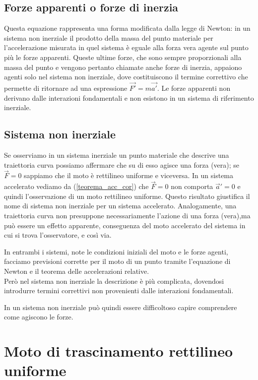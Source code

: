 \documentclass[class=book, crop=false, oneside, 12pt]{standalone}
\begin{document}
\subsection{Forze apparenti o forze di inerzia}
Questa equazione rappresenta una forma modificata dalla legge di Newton: in un sistema non inerziale il prodotto della massa del punto materiale per l'accelerazione misurata in quel sistema è eguale alla forza vera agente sul punto più le forze apparenti. 
Queste ultime forze, che sono sempre proporzionali alla massa del punto e vengono pertanto chiamate anche forze di inerzia, appaiono agenti solo nel sistema non inerziale, dove costituiscono il termine correttivo che permette di ritornare ad una espressione \(\overrightarrow{F'} = m \overrightarrow{a'}\).
Le forze apparenti non derivano dalle interazioni fondamentali e non esistono in un sistema di riferimento inerziale.

\subsection{Sistema non inerziale}

Se osserviamo in un sistema inerziale un punto materiale che descrive una traiettoria curva possiamo affermare che su di esso agisce una forza (vera); se \(\overrightarrow{F} = 0\) sappiamo che il moto è rettilineo uniforme e viceversa.\newline
In un sistema accelerato vediamo da (\ref{teorema_acc_cor}) che \(\overrightarrow{F} = 0\) non comporta \(\overrightarrow{a}' = 0\) e quindi l'osservazione di un moto rettilineo uniforme. 
Questo risultato giustifica il nome di sistema non inerziale per un sistema accelerato. 
Analogamente, una traiettoria curva non presuppone necessariamente l'azione di una forza (vera),ma può essere un effetto apparente, conseguenza del moto accelerato del sistema in cui si trova l'osservatore, e così via.

In entrambi i sistemi, note le condizioni iniziali del moto e le forze agenti, facciamo previsioni corrette per il moto di un punto tramite l'equazione di Newton e il teorema delle accelerazioni relative. \\
Però nel sistema non inerziale la descrizione è più complicata, dovendosi introdurre termini correttivi non provenienti dalle interazioni fondamentali.

In un sistema non inerziale può quindi essere difficoltoso capire comprendere come agiscono le forze. 

\section{Moto di trascinamento rettilineo uniforme}
\end{document}
